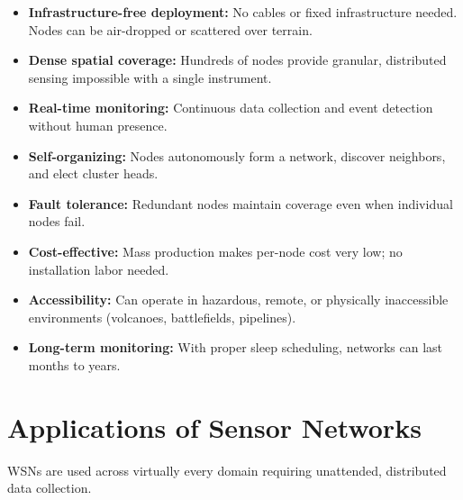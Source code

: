 \documentclass[12pt,a4paper]{article}
\begin{document}
\begin{tcolorbox}[examplebox, title={\textbf{Why Use WSNs? --- Key Advantages}}]
\begin{itemize}[leftmargin=*, itemsep=4pt]
  \item \textbf{Infrastructure-free deployment:} No cables or fixed infrastructure needed. Nodes can be air-dropped or scattered over terrain.
  \item \textbf{Dense spatial coverage:} Hundreds of nodes provide granular, distributed sensing impossible with a single instrument.
  \item \textbf{Real-time monitoring:} Continuous data collection and event detection without human presence.
  \item \textbf{Self-organizing:} Nodes autonomously form a network, discover neighbors, and elect cluster heads.
  \item \textbf{Fault tolerance:} Redundant nodes maintain coverage even when individual nodes fail.
  \item \textbf{Cost-effective:} Mass production makes per-node cost very low; no installation labor needed.
  \item \textbf{Accessibility:} Can operate in hazardous, remote, or physically inaccessible environments (volcanoes, battlefields, pipelines).
  \item \textbf{Long-term monitoring:} With proper sleep scheduling, networks can last months to years.
\end{itemize}
\end{tcolorbox}

\section{Applications of Sensor Networks}

WSNs are used across virtually every domain requiring unattended, distributed data collection.
\end{document}
